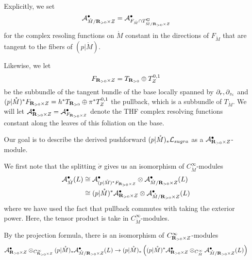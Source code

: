 Explicitly, we set
\[
  \mathcal A^{\bullet}_{\mathring M/\mathbf{R}_{>0}\times Z} = \mathcal A^{\bullet}_{F_{\mathring M}\cap T^{\mathbf{C}}_{\mathring M/ \mathbf{R}_{>0}\times Z}}
\]
for the complex resoling functions on $\mathring M$ constant in the directions of $F_{\mathring M}$ that are tangent to the fibers of $(p|\mathring M)$.

Likewise, we let
\[
  F_{\mathbf{R}_{>0}\times Z} = T_{\mathbf{R}_{>0}}\oplus T^{0,1}_{Z}
\] 
be the subbundle of the tangent bundle of the base locally spanned by $\partial_{r}, \partial_{z_{i}}$ and $(p|\mathring M)^{*}F_{\mathbf{R}_{>0}\times Z} = h^{*}T_{\mathbf{R}_{>0}}\oplus \pi^{*}T^{0,1}_{Z}$ the pullback, which is a subbundle of $T_{\mathring M}$. We will let $\mathcal A^{\bullet}_{\mathbf{R}_{>0}\times Z} = \mathcal A^{\bullet}_{F _{\mathbf{R}_{>0}\times Z}}$ denote the THF complex resolving functions constant along the leaves of this foliation on the base.

Our goal is to describe the derived pushforward $(p|\mathring M)_{*}\mathcal L_{sugra}$ as a $\mathcal A^{\bullet}_{\mathbf{R}_{>0}\times Z}$-module.

We first note that the splitting $\mathring \sigma$ gives us an isomorphism of $C^{\infty}_{\mathring M}$-modules
\begin{align*}
  \mathcal A^{\bullet}_{\mathring M}(L) & \cong \mathcal A^{\bullet}_{(p|\mathring M)^{*}F_{\mathbf{R}_{>0}\times Z}}\otimes \mathcal A^{\bullet}_{{\mathring M/ \mathbf{R}_{>0}\times Z}}(L) \\
                         & \cong (p|\mathring M)^{*}\mathcal A ^{\bullet}_{\mathbf{R}_{>0}\times Z}\otimes \mathcal A^{\bullet}_{{\mathring M/ \mathbf{R}_{>0}\times Z}}(L) \\
\end{align*}
where we have used the fact that pullback commutes with taking the exterior power. Here, the tensor product is take in $C^{\infty}_{\mathring M}$-modules.


By the projection formula, there is an isomorphism of $C^{\infty}_{\mathbf{R}_{>0}\times Z}$-modules
\[
\mathcal A ^{\bullet}_{\mathbf{R}_{>0}\times Z}\otimes_{C^{\infty}_{\mathbf{R}_{>0}\times Z}} (p|\mathring M)_{*}\mathcal A^{\bullet}_{{\mathring M/ \mathbf{R}_{>0}\times Z}}(L) \to (p|\mathring M)_{*}\left ( (p|\mathring M)^{*}\mathcal A ^{\bullet}_{\mathbf{R}_{>0}\times Z}\otimes_{C^{\infty}_{\mathring M}} \mathcal A^{\bullet}_{{\mathring M/ \mathbf{R}_{>0}\times Z}}(L) \right )\]

